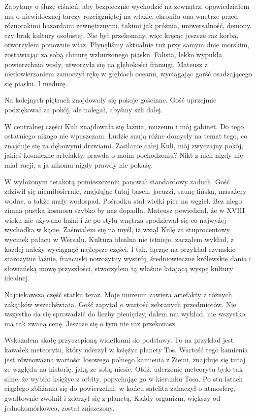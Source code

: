 Zapytany o śluzę ciśnień, aby bezpiecznie wychodzić na zewnątrz, opowiedziałem mu o niewidocznej tarczy rozciągniętej na włazie, chroniła ona wnętrze przed różnorakimi hazardami zewnętrznymi, takimi jak próżnia, uniwersalność, demony, czy brak kultury osobistej.
Nie był przekonany, więc kręcąc jeszcze raz korbą, otworzyłem ponownie właz. 
Płynęliśmy aktualnie tuż przy samym dnie morskim, zostawiając za sobą chmurę wzburzonego piasku.
Falista, lekko wypukła powierzchnia wody, utworzyła się na głębokości framugi. 
Mateusz z niedowierzaniem zamoczył rękę w głębiach oceanu, wyciągając garść osadzającego się piasku.
I meduzę.

Na kolejnych piętrach znajdowały się pokoje gościnne. Gość uprzejmie podziękował za pokój, ale nalegał, abyśmy szli dalej.

W centralnej części Kuli znajdowała się łaźnia, muzeum i mój gabinet. Do tego ostatniego nikogo nie wpuszczam.
Ludzie snują różne domysły na temat tego, co znajduje się za dębowymi drzwiami. 
Zasilanie całej Kuli, mój zwyczajny pokój, jakieś kosmiczne artefakty, prawda o moim pochodzeniu?
Nikt z nich nigdy nie miał racji, a ja nikomu nigdy prawdy nie pokażę.

W wyłożonym terakotą pomieszczeniu panował standardowy zaduch. Gość zdziwił się niemiłosiernie, znajdując tutaj basen, jacuzzi, saunę fińską, masażery wodne, a także mały wodospad.
Pośrodku stał wielki piec na węgiel. Bez niego zimna pustka kosmosu szybko by nas dopadła.
Mateusz powiedział, że w XVIII wieku nie używano łaźni i że po stylu wnętrza spodziewał się co najwyżej wychodka w kącie. 
Zaśmiałem się na myśl, iż wziął Kulę za stuprocentowy wycinek pałacu w Wersalu.
Kultura idealna nie istnieje, zacząłem wykład, z każdej należy wyciągnąć najlepsze części. 
I tak, łącząc na przykład rzymskie starożytne łaźnie, francuski nowożytny wystrój, średniowieczne królewskie dania i słowiańską mowę przyszłości, 
stworzyłem tą właśnie latającą wyspę kultury idealnej.

Najciekawsza część statku teraz.
Moje muzeum zawiera artefakty z różnych zakątków wszechświata. Gość zapytał o wartość zebranych przedmiotów.
Nie wszystko da się sprowadzić do liczby pieniędzy, dałem mu wykład, nie wszystko ma tak zwaną cenę. 
Jeszcze się o tym nie raz przekonasz.

Wskazałem skałę przyczepioną widełkami do podstawy. 
To na przykład jest kawałek meteorytu, który uderzył w księżyc planety Tos. Wartość tego kamienia jest równoważna wartości losowego polnego kamienia z Ziemi, 
znajduje się tutaj ze względu na historię, jaką ze sobą niesie.
Otóż, uderzenie meteorytu było tak silne, że wybiło księżyc z orbity, popychając go w kierunku Tosa.
Po stu latach ciągłego zbliżania się do powierzchni, w końcu satelita zahaczył o atmosferę, gwałtownie zwolnił i zderzył się z planetą.
Każdy organizm, większy od jednokomórkowca, został zniszczony.

